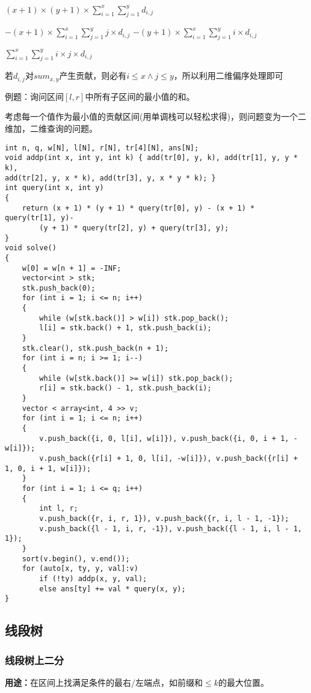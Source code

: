 \documentclass[a4paper, fontset=none]{ctexart}
\begin{document}
$(x+1)\times (y+1)\times \sum_{i=1}^x\sum_{j=1}^y d_{i, j}$

$-(x+1)\times \sum_{i=1}^x\sum_{j=1}^y j\times d_{i, j}$
$-(y+1)\times \sum_{i=1}^x\sum_{j=1}^y i\times d_{i, j}$

$\sum_{i=1}^x\sum_{j=1}^y i\times j\times d_{i, j}$

若$d_{i, j}$对$sum_{x, y}$产生贡献，则必有$i\leqslant x\land j\leqslant y$，所以利用二维偏序处理即可

例题：询问区间$[l, r]$中所有子区间的最小值的和。

考虑每一个值作为最小值的贡献区间(用单调栈可以轻松求得)，则问题变为一个二维加，二维查询的问题。

\begin{verbatim}
int n, q, w[N], l[N], r[N], tr[4][N], ans[N];
void addp(int x, int y, int k) { add(tr[0], y, k), add(tr[1], y, y * k),
add(tr[2], y, x * k), add(tr[3], y, x * y * k); }
int query(int x, int y)
{
    return (x + 1) * (y + 1) * query(tr[0], y) - (x + 1) * query(tr[1], y)-
        (y + 1) * query(tr[2], y) + query(tr[3], y);
}
void solve()
{
    w[0] = w[n + 1] = -INF;
    vector<int > stk;
    stk.push_back(0);
    for (int i = 1; i <= n; i++)
    {
        while (w[stk.back()] > w[i]) stk.pop_back();
        l[i] = stk.back() + 1, stk.push_back(i);
    }
    stk.clear(), stk.push_back(n + 1);
    for (int i = n; i >= 1; i--)
    {
        while (w[stk.back()] >= w[i]) stk.pop_back();
        r[i] = stk.back() - 1, stk.push_back(i);
    }
    vector < array<int, 4 >> v;
    for (int i = 1; i <= n; i++)
    {
        v.push_back({i, 0, l[i], w[i]}), v.push_back({i, 0, i + 1, -w[i]});
        v.push_back({r[i] + 1, 0, l[i], -w[i]}), v.push_back({r[i] + 1, 0, i + 1, w[i]});
    }
    for (int i = 1; i <= q; i++)
    {
        int l, r;
        v.push_back({r, i, r, 1}), v.push_back({r, i, l - 1, -1});
        v.push_back({l - 1, i, r, -1}), v.push_back({l - 1, i, l - 1, 1});
    }
    sort(v.begin(), v.end());
    for (auto[x, ty, y, val]:v)
        if (!ty) addp(x, y, val);
        else ans[ty] += val * query(x, y);
}
\end{verbatim}
\subsection{线段树}
\subsubsection{线段树上二分}
\textbf{用途：}在区间上找满足条件的最右/左端点，如前缀和$\leq k$的最大位置。
\end{document}
